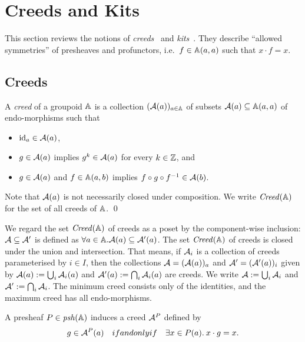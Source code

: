 \section{Creeds and Kits}
This section reviews the notions of \emph{creeds}~\cite{Taylor1989} and \emph{kits}~\cite{Fiore2024}.
They describe ``allowed symmetries'' of presheaves and profunctors, i.e.~\( f \in \mathbb{A}(a,a) \) such that \( x \cdot f = x \).

\subsection{Creeds}
\begin{definition}[Creed]
    A \emph{creed} of a groupoid \( \mathbb{A} \) is a collection \( (\mathcal{A}(a))_{a \in \mathbb{A}} \) of subsets \( \mathcal{A}(a) \subseteq \mathbb{A}(a,a) \) of endo-morphisms such that
    \begin{itemize}
        \item \( \mathrm{id}_a \in \mathcal{A}(a) \), 
        \item \( g \in \mathcal{A}(a) \) implies \( g^k \in \mathcal{A}(a) \) for every \( k \in \mathbb{Z} \), and
        \item \( g \in \mathcal{A}(a) \) and \( f \in \mathbb{A}(a,b) \) implies \( f \circ g \circ f^{-1} \in \mathcal{A}(b) \).
    \end{itemize}
    Note that \( \mathcal{A}(a) \) is not necessarily closed under composition.
    We write \( \mathit{Creed}(\mathbb{A}) \) for the set of all creeds of \( \mathbb{A} \).
    \qed
\end{definition}

We regard the set \( \mathit{Creed}(\mathbb{A}) \) of creeds as a poset by the component-wise inclusion: \( \mathcal{A} \subseteq \mathcal{A}' \) is defined as \( \forall a \in \mathbb{A}. \mathcal{A}(a) \subseteq \mathcal{A}'(a) \).
The set \( \mathit{Creed}(\mathbb{A}) \) of creeds is closed under the union and intersection.
That means, if \( \mathcal{A}_i \) is a collection of creeds parameterised by \( i \in I \), then the collections \( \mathcal{A} = (\mathcal{A}(a))_a \) and \( \mathcal{A}' = (\mathcal{A}'(a))_i \) given by \( \mathcal{A}(a) := \bigcup_i \mathcal{A}_i(a) \) and \( \mathcal{A}'(a) := \bigcap_i \mathcal{A}_i(a) \) are creeds.
We write \( \mathcal{A} := \bigcup_i \mathcal{A}_i \) and \( \mathcal{A}' := \bigcap_i \mathcal{A}_i \).
The minimum creed consists only of the identities, and the maximum creed has all endo-morphisms.

A presheaf \( P \in \mathit{psh}(\mathbb{A}) \) induces a creed \( \mathcal{A}^P \) defined by
\begin{equation*}
    g \in \mathcal{A}^P(a)
    \quad\relax{if and only if}\quad
    \exists x \in P(a).\: x \cdot g = x.
\end{equation*}

